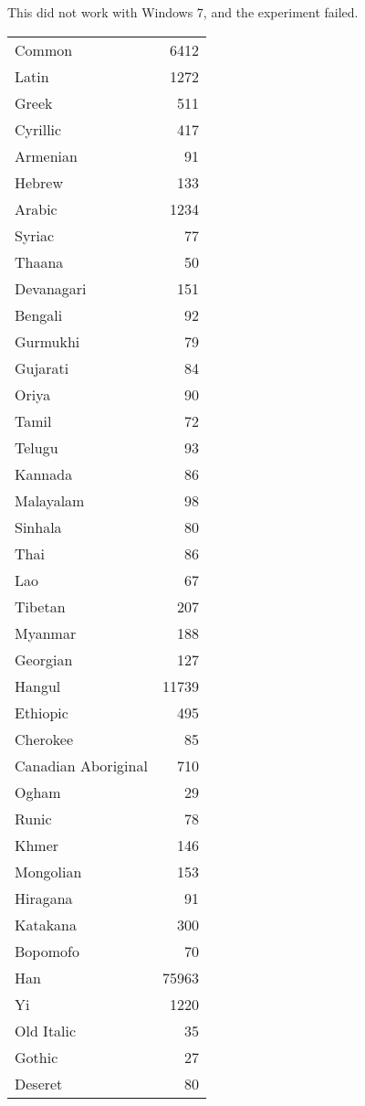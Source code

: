 This did not work with Windows 7, and the experiment failed. 









\arial
\begin{longtable}{lr}
Common	&6412\\
Latin	&1272\\
Greek	&511\\
Cyrillic	&417\\
Armenian	&91\\
Hebrew	 &133\\
Arabic	 &1234\\
Syriac	 &77\\
Thaana	 &50\\
Devanagari	&151\\
Bengali	&92\\
Gurmukhi	&79\\
Gujarati	&84\\
Oriya	&90\\
Tamil	&72\\
Telugu	&93\\
Kannada	&86\\
Malayalam	&98\\
Sinhala	&80\\
Thai	&86\\
Lao	 &67\\
Tibetan	&207\\
Myanmar	&188\\
Georgian	&127\\
Hangul	   &11739\\
Ethiopic	&495\\
Cherokee	&85\\
Canadian Aboriginal	 &710\\
Ogham	&29\\
Runic	&78\\
Khmer	&146\\
Mongolian	&153\\
Hiragana	&91\\
Katakana	&300\\
Bopomofo	&70\\
Han	 &75963\\
Yi	&1220\\
Old Italic	&35\\
Gothic	 &27\\
Deseret	&80\\

\end{longtable}

